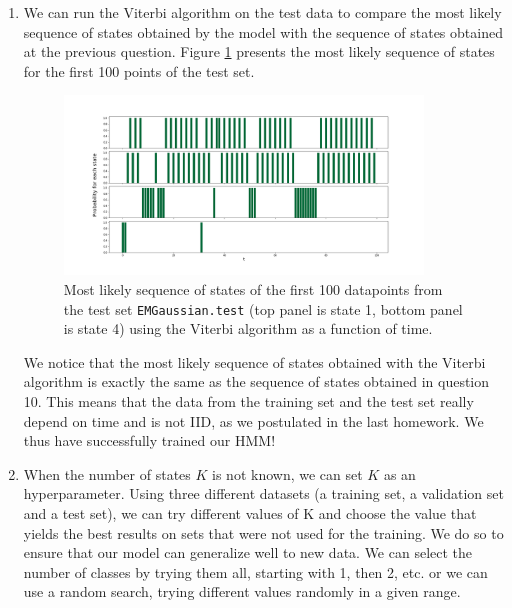 \documentclass[11pt]{article}
\begin{document}
\begin{enumerate}
\item %

We can run the Viterbi algorithm on the test data to compare the most likely sequence of states obtained by the model with the sequence of states obtained at the previous question. Figure \ref{fig:real_parameters_viterbi} presents the most likely sequence of states for the first 100 points of the test set.

\begin{figure}[h!tbp]
\begin{center}
\includegraphics[width=0.9\textwidth]{figures/real_param_viterbi.png}
\caption{Most likely sequence of states of the first 100 datapoints from the test set \texttt{EMGaussian.test}  (top panel is state 1, bottom panel is state 4) using the Viterbi algorithm as a function of time.}
\label{fig:real_parameters_viterbi}
\end{center}
\end{figure}

We notice that the most likely sequence of states obtained with the Viterbi algorithm is exactly the same as the sequence of states obtained in question 10. This means that the data from the training set and the test set really depend on time and is not IID, as we postulated in the last homework. We thus have successfully trained our HMM!


\item %

When the number of states $K$ is not known, we can set $K$ as an hyperparameter. Using three different datasets (a training set, a validation set and a test set), we can try different values of K and choose the value that yields the best results on sets that were not used for the training. We do so to ensure that our model can generalize well to new data. We can select the number of classes by trying them all, starting with 1, then 2, etc. or we can use a random search, trying different values randomly in a given range.


\end{enumerate}
\end{document}
